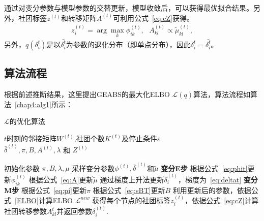 通过对变分参数与模型参数的交替更新，模型收敛后，可以获得最优拟合结果。另外，社团标签$z^{(t)}$和转移矩阵$A^{(t)}$可利用公式~\ref{eq:cZ}获得。
\begin{equation}
\begin{split}
z^{(t)}_i = \arg \max_k \phi_{ik}^{(t)}, ~~~A_{kl}^{(t)} \propto \tilde{\mu}_{kl}^{(t)},
\end{split}
\label{eq:cZ}
\end{equation}
另外，$q(\delta_i^t)$是以$\bar{\delta_i^t}$为参数的退化分布（即单点分布），因此$\delta_i^t = \bar{\delta_i^t}$。



\subsection{算法流程}
根据前述推断结果，这里提出GEABS的最大化ELBO $\mathscr{L}(q)$算法，算法流程如算法~\ref{chap4:alg1}所示：

\begin{algorithm}[H]
\caption{$\mathcal{L}$的优化算法}\label{chap4:alg1}
\algorithmicrequire \;$t$时刻的邻接矩阵$W^{(t)}$,社团个数$K^{(t)}$及停止条件$\varepsilon$\\
\algorithmicensure \;$\bar{\delta}^{(t)}, \pi, B, A^{(t)},\lambda$ 和 $Z^{(t)}$
\begin{algorithmic}[1]
\STATE 初始化参数 $\pi,B,\lambda, \mu$
\STATE 采样变分参数$\phi^{(t)},\bar{\delta}^{(t)}$和$\tilde{\mu}$
\REPEAT
    \STATE \textbf{变分E步}
    \STATE 根据公式~\ref{eq:phit}更新$\phi^{(t)}_{ik}$
    \STATE 根据公式~\ref{eq:A}更新$\tilde{\mu}$
     \STATE 通过梯度上升法更新$\bar{\delta}_i^{(t)}$，梯度为~\ref{eq:deltat}
    \STATE \textbf{变分M步}
    \STATE 根据公式~\ref{eq:pi}更新$\pi$
    \STATE 根据公式~\ref{eq:sBT}更新$B$
    \STATE 利用更新后的参数，依据公式~\ref{ELBO}计算ELBO $\mathcal{L}^{new}$
\ENDFOR
{}
\STATE 获得每个节点的社团标签$z^{(t)}_i$，依据公式~\ref{eq:cZ}计算社团转移参数$A_{kl}^t$并返回参数$\delta^{(t)}_i$.
\ENDFOR  
\end{algorithmic}
\end{algorithm}

